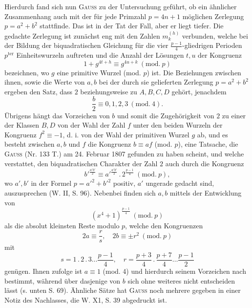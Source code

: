 Hierdurch fand sich nun \textsc{Gauss} zu der Untersuchung geführt, ob ein ähnlicher Zusammenhang auch mit der für jede Primzahl \(p=4n+1\) möglichen Zerlegung \(p=a^2+b^2\) stattfinde. Das ist in der Tat der Fall, aber er liegt tiefer. Die gedachte Zerlegung ist zunächst eng mit den Zahlen \(m_k^{(h)}\) verbunden, welche bei der Bildung der biquadratischen Gleichung für die vier \(\frac{p-1}{4}\)-gliedrigen Perioden \(p^{\mathrm{ter}}\) Einheitswurzeln auftreten und die Anzahl der Lösungen \(t,u\) der Kongruenz
\[
1+g^{4t+h}\equiv g^{4u+k}\ (\mathrm{mod.}\ p)
\]
bezeichnen, wo \(g\) eine primitive Wurzel (mod. \(p\)) ist. Die Beziehungen zwischen ihnen, sowie die Werte von \(a,b\) bei der durch sie gelieferten Zerlegung
\newpage{}
\noindent \(p=a^2+b^2\) ergeben den Satz, dass \(2\) beziehungsweise zu \(A,B,C,D\) gehört, jenachdem
\[
\frac{b}{2}\equiv0,1,2,3\ (\mathrm{mod.}\ 4).
\]
Übrigens hängt das Vorzeichen von \(b\) und somit die Zugehörigkeit von \(2\) zu einer der Klassen \(B,D\) von der Wahl der Zahl \(f\) unter den beiden Wurzeln der Kongruenz \(f^2\equiv-1\), d. i. von der Wahl der primitiven Wurzel \(g\) ab, und es besteht zwischen \(a,b\) und \(f\) die Kongruenz \(b\equiv af\) (mod. \(p\)), eine Tatsache, die \textsc{Gauss} (Nr. 133 T.) am 24. Februar 1807 gefunden zu haben scheint, und welche verstattet, den biquadratischen Charakter der Zahl \(2\) auch durch die Kongruenz
\[
b'^{\frac{a'b'}{2}}\equiv a'^{\frac{a'b'}{2}}\mathbin{.}2^{\frac{p-1}{4}}\ (\mathrm{mod.}\ p),
\]
wo \(a',b'\) in der Formel \(p=a'^2+b'^2\) positiv, \(a'\) ungerade gedacht sind, auszusprechen (W. II, S. 96). Nebenbei finden sich \(a,b\) mittels der Entwicklung von
\[
(x^4+1)^{\frac{p-1}{4}}\ (\mathrm{mod.}\ p)
\]
als die absolut kleinsten Reste modulo \(p\), welche den Kongruenzen
\[
2a\equiv\frac{r}{s},\quad 2b\equiv\pm r^2\ (\mathrm{mod.}\ p)
\]
mit
\[
s=1\mathbin{.}2\mathbin{.}3\ldots\frac{p-1}{4},\quad r=\frac{p+3}{4}\mathbin{.}\frac{p+7}{4}\ldots\frac{p-1}{2}
\]
genügen. Ihnen zufolge ist \(a\equiv1\) (mod. 4) und hierdurch seinem Vorzeichen nach bestimmt, während über dasjenige von \(b\) sich ohne weiteres nicht entscheiden lässt (s. unten S. 69). Ähnliche Sätze hat \textsc{Gauss} noch mehrere gegeben in einer Notiz des Nachlasses, die W. X1, S. 39 abgedruckt ist.
